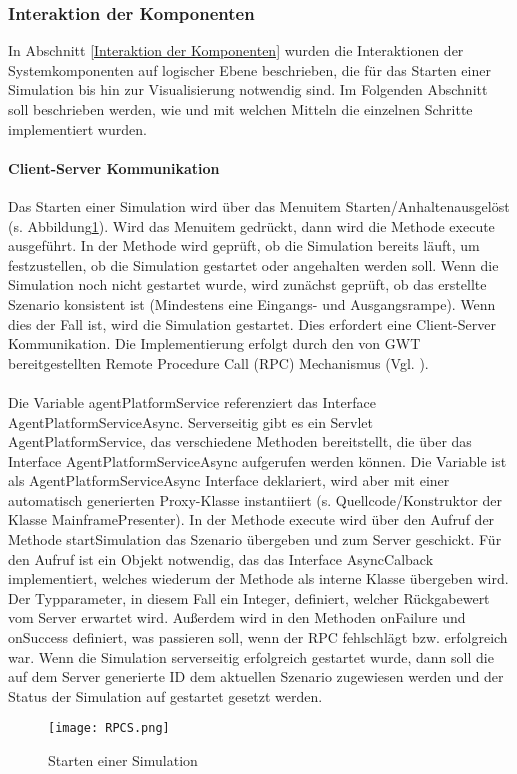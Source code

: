 \subsubsection{Interaktion der Komponenten}
In Abschnitt \ref{Interaktion der Komponenten} wurden die Interaktionen der Systemkomponenten auf logischer Ebene beschrieben, die für das Starten einer Simulation bis hin zur Visualisierung notwendig sind. Im Folgenden Abschnitt soll beschrieben werden, wie und mit welchen Mitteln die einzelnen Schritte implementiert wurden. 
\paragraph{Client-Server Kommunikation}
Das Starten einer Simulation wird über das Menuitem \glqq Starten/Anhalten\grqq ausgelöst (s. Abbildung\ref{RPCS}). Wird das Menuitem gedrückt, dann wird die Methode execute ausgeführt. In der Methode wird geprüft, ob die Simulation bereits läuft, um festzustellen, ob die Simulation gestartet oder angehalten werden soll. Wenn die Simulation noch nicht gestartet wurde, wird zunächst geprüft, ob das erstellte Szenario konsistent ist (Mindestens eine Eingangs- und Ausgangsrampe). Wenn dies der Fall ist, wird die Simulation gestartet. Dies erfordert eine Client-Server Kommunikation. Die Implementierung erfolgt durch den von GWT bereitgestellten Remote Procedure Call (RPC) Mechanismus (Vgl. \cite{gwtrpc}). 
\\\\
Die  Variable agentPlatformService referenziert das Interface AgentPlatformServiceAsync. Serverseitig gibt es ein Servlet \glqq AgentPlatformService\grqq , das verschiedene Methoden bereitstellt, die über das Interface AgentPlatformServiceAsync aufgerufen werden können. Die Variable ist als AgentPlatformServiceAsync Interface deklariert, wird aber mit einer automatisch generierten Proxy-Klasse instantiiert (s. Quellcode/Konstruktor der Klasse MainframePresenter). In der Methode execute wird über den Aufruf der Methode startSimulation das Szenario übergeben und zum Server geschickt. Für den Aufruf ist ein Objekt notwendig, das das Interface AsyncCalback implementiert, welches wiederum der Methode als interne Klasse übergeben wird. Der Typparameter, in diesem Fall ein Integer, definiert, welcher Rückgabewert vom Server erwartet wird. Außerdem wird in den Methoden onFailure und onSuccess definiert, was passieren soll, wenn der RPC fehlschlägt bzw. erfolgreich war. Wenn die Simulation serverseitig erfolgreich gestartet wurde, dann soll die auf dem Server generierte ID dem aktuellen Szenario zugewiesen werden und der Status der Simulation auf gestartet gesetzt werden.    
\begin{figure}[h!]
	\centering
		\texttt{[image: RPCS.png]}        
		\caption{Starten einer Simulation}
	\label{RPCS}
\end{figure}
